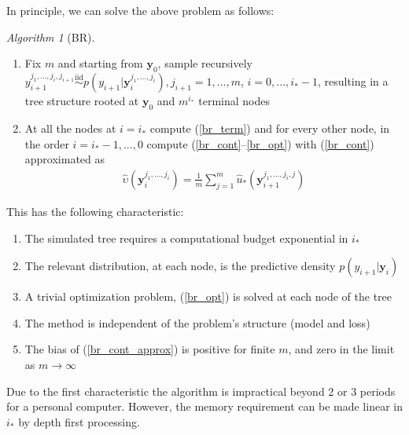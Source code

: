 \documentclass[11pt]{article}
\begin{document}
In principle, we can solve the above problem as follows:
\theoremstyle{remark}
\newtheorem{algorithm}{Algorithm}
\begin{algorithm}[BR]\label{alg:BR}
\hfill\par
\begin{enumerate}
\item Fix $m$ and starting from $\mathbf{y}_0$, sample recursively $y_{i+1}^{j_1,...,j_i,j_{i+1}}\stackrel{\mathrm{iid}}{\sim}p(y_{i+1}|\mathbf{y}_{i}^{j_1,...,j_i}), j_{i+1}=1,...,m$, $i=0,...,i_*-1$, resulting in a tree structure rooted at $\mathbf{y}_0$ and $m^{i_*}$ terminal nodes\\
\item At all the nodes at $i=i_*$ compute (\ref{br_term}) and for every other node, in the order $i=i_*-1,...,0$ compute (\ref{br_cont}--\ref{br_opt}) with (\ref{br_cont}) approximated as 
\begin{align}\label{br_cont_approx}
\hat \upsilon(\mathbf{y}_i^{j_1,...,j_i})=\frac{1}{m}\sum_{j=1}^m \hat u_*(\mathbf{y}_{i+1}^{j_1,...,j_i,j})
\end{align}
\end{enumerate}
\end{algorithm}
This has the following characteristic:
\begin{enumerate}
\item The simulated tree requires a computational budget exponential in $i_*$\\
\item The relevant distribution, at each node, is the predictive density $p(y_{i+1}|\mathbf{y}_i)$\\
\item A trivial optimization problem, (\ref{br_opt}) is solved at each node of the tree\\
\item The method is independent of the problem's structure (model and loss)
\item The bias of (\ref{br_cont_approx}) is positive for finite $m$, and zero in the limit as $m\rightarrow\infty$
\end{enumerate}Due to the first characteristic the algorithm is impractical beyond 2 or 3 periods for a personal computer. However, the memory requirement can be made linear in $i_*$ by depth first processing.\par
\end{document}
